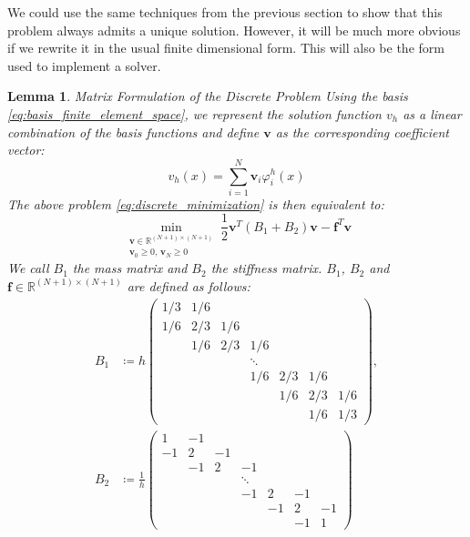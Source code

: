 \documentclass[headsepline,footsepline,footinclude=false,oneside,fontsize=11pt,paper=a4,listof=totoc,bibliography=totoc]{scrbook} %
\newtheorem{lemma}{Lemma}
\begin{document}
We could use the same techniques from the previous section to show that this problem always admits a unique solution. However, it will be much more obvious if we rewrite it in the usual finite dimensional form. This will also be the form used to implement a solver.

\begin{lemma} Matrix Formulation of the Discrete Problem \newline
	Using the basis \eqref{eq:basis_finite_element_space}, we represent the solution function $v_h$ as a linear combination of the basis functions and define $\mathbf{v}$ as the corresponding coefficient vector:
	\begin{equation} \label{eq:basis_representation_v_h}
	v_h(x) = \sum_{i=1}^{N} \mathbf{v}_i \varphi_i^h(x)
	\end{equation}
		The above problem \eqref{eq:discrete_minimization} is then equivalent to:
		\begin{equation} \label{eq:matrix_formulation}
		\min_{\substack{\mathbf{v} \in \mathbb{R}^{(N+1)\times(N+1)}\\ \mathbf{v}_{0} \geq 0,\, \mathbf{v}_N \geq 0}} \frac{1}{2} \mathbf{v}^T (B_1 + B_2) \mathbf{v} - \mathbf{f}^T  \mathbf{v}
		\end{equation}
		We call $B_1$ the \emph{mass matrix} and $B_2$ the \emph{stiffness matrix}. $B_1$, $B_2$ and $\mathbf{f} \in \mathbb{R}^{(N+1)\times(N+1)}$ are defined as follows:
		\begin{align*}
		B_1 &\coloneqq 			h	\begin{pmatrix}
		1/3& 1/6 & & & & & \\
		1/6& 2/3& 1/6 & & & & \\
		& 1/6& 2/3& 1/6 & & & \\
		& & & \ddots & & & \\
		& & & 1/6& 2/3& 1/6 & \\
		& & & & 1/6& 2/3& 1/6 \\
		& & & & & 1/6& 1/3
		\end{pmatrix}, \\
		 B_2 &\coloneqq \frac{1}{h} 			\begin{pmatrix}
		1& -1 & & & & & \\
		-1& 2& -1 & & & & \\
		& -1& 2& -1 & & & \\
		& & & \ddots & & & \\
		& & & -1& 2& -1 & \\
		& & & & -1& 2& -1 \\
		& & & & & -1& 1

\end{pmatrix}
\end{align*}
\end{lemma}
\end{document}
